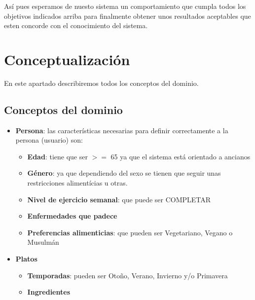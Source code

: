 \documentclass[12]{article}
\begin{document}
Así pues esperamos de nuesto sistema un comportamiento que cumpla todos los objetivos indicados arriba para finalmente obtener unos resultados aceptables que esten concorde con el conocimiento del sistema. 
\section{Conceptualización}
En este apartado describiremos todos los conceptos del dominio. 

\subsection{Conceptos del dominio}
\begin{itemize}
\item \textbf{Persona}: las características necesarias para definir correctamente a la persona (usuario) son: \begin{itemize}
	\item \textbf{Edad}: tiene que ser $>=$ 65 ya que el sistema está orientado a ancianos
	\item \textbf{Género}: ya que dependiendo del sexo se tienen que seguir unas restricciones alimentícias u otras.
	\item \textbf{Nivel de ejercicio semanal}: que puede ser COMPLETAR
	\item \textbf{Enfermedades que padece}
	\item \textbf{Preferencias alimenticias}: que pueden ser Vegetariano, Vegano o Musulmán
	\end{itemize}
	\item \textbf{Platos}
	\begin{itemize}
		\item \textbf{Temporadas}: pueden ser Otoño, Verano, Invierno y/o Primavera
		\item \textbf{Ingredientes}		
	\end{itemize}


\end{itemize}
\end{document}
